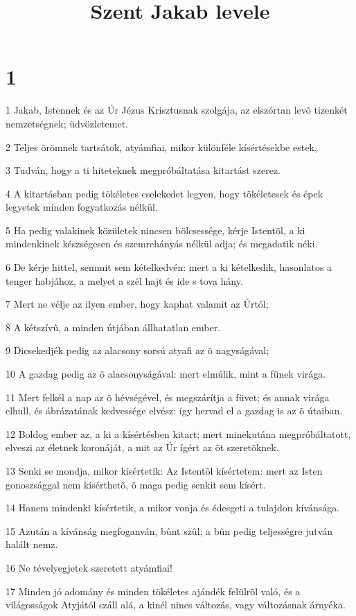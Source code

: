 

\title{Szent Jakab levele}


\chapter{1}

\par 1 Jakab, Istennek és az Úr Jézus Krisztusnak szolgája, az elszórtan levõ tizenkét nemzetségnek; üdvözletemet.
\par 2 Teljes örömnek tartsátok, atyámfiai, mikor különféle kísértésekbe estek,
\par 3 Tudván, hogy a ti hiteteknek megpróbáltatása kitartást szerez.
\par 4 A kitartásban pedig tökéletes cselekedet legyen, hogy tökéletesek és épek legyetek minden fogyatkozás nélkül.
\par 5 Ha pedig valakinek közületek nincsen bölcsessége, kérje  Istentõl, a ki mindenkinek készségesen és szemrehányás nélkül adja; és megadatik néki.
\par 6 De kérje hittel, semmit sem kételkedvén: mert a ki kételkedik, hasonlatos a tenger habjához, a melyet a szél hajt és ide s tova hány.
\par 7 Mert ne vélje az ilyen ember, hogy kaphat valamit az Úrtól;
\par 8 A kétszívû, a minden útjában állhatatlan ember.
\par 9 Dicsekedjék pedig az alacsony sorsú atyafi az õ nagyságával;
\par 10 A gazdag pedig az õ alacsonyságával: mert elmúlik, mint a fûnek virága.
\par 11 Mert felkél a nap az õ hévségével, és megszárítja a füvet; és annak virága elhull, és ábrázatának kedvessége elvész: így hervad el a  gazdag is az õ útaiban.
\par 12 Boldog ember az, a ki a kísértésben kitart; mert minekutána megpróbáltatott, elveszi az életnek koronáját, a mit az Úr ígért az õt szeretõknek.
\par 13 Senki se mondja, mikor kísértetik: Az Istentõl kísértetem: mert az Isten gonoszsággal nem kísérthetõ, õ maga pedig senkit sem kísért.
\par 14 Hanem mindenki kísértetik, a mikor vonja és édesgeti a tulajdon kívánsága.
\par 15 Azután a kívánság megfoganván, bûnt szûl; a bûn pedig teljességre jutván halált nemz.
\par 16 Ne tévelyegjetek szeretett atyámfiai!
\par 17 Minden jó adomány és minden tökéletes ajándék felülrõl való, és a világosságok Atyjától száll alá, a kinél nincs változás, vagy változásnak árnyéka.
